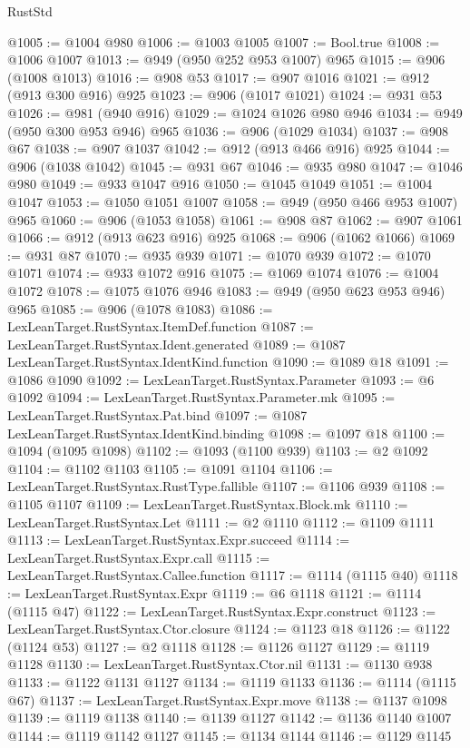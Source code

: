 \begin{lexlean}{RustStd}
\begin{coremodule}
@1005 := @1004 @980
@1006 := @1003 @1005
@1007 := Bool.true
@1008 := @1006 @1007
@1013 := @949 (@950 @252 @953 @1007) @965
@1015 := @906 (@1008 @1013)
@1016 := @908 @53
@1017 := @907 @1016
@1021 := @912 (@913 @300 @916) @925
@1023 := @906 (@1017 @1021)
@1024 := @931 @53
@1026 := @981 (@940 @916)
@1029 := @1024 @1026 @980 @946
@1034 := @949 (@950 @300 @953 @946) @965
@1036 := @906 (@1029 @1034)
@1037 := @908 @67
@1038 := @907 @1037
@1042 := @912 (@913 @466 @916) @925
@1044 := @906 (@1038 @1042)
@1045 := @931 @67
@1046 := @935 @980
@1047 := @1046 @980
@1049 := @933 @1047 @916
@1050 := @1045 @1049
@1051 := @1004 @1047
@1053 := @1050 @1051 @1007
@1058 := @949 (@950 @466 @953 @1007) @965
@1060 := @906 (@1053 @1058)
@1061 := @908 @87
@1062 := @907 @1061
@1066 := @912 (@913 @623 @916) @925
@1068 := @906 (@1062 @1066)
@1069 := @931 @87
@1070 := @935 @939
@1071 := @1070 @939
@1072 := @1070 @1071
@1074 := @933 @1072 @916
@1075 := @1069 @1074
@1076 := @1004 @1072
@1078 := @1075 @1076 @946
@1083 := @949 (@950 @623 @953 @946) @965
@1085 := @906 (@1078 @1083)
@1086 := LexLeanTarget.RustSyntax.ItemDef.function
@1087 := LexLeanTarget.RustSyntax.Ident.generated
@1089 := @1087 LexLeanTarget.RustSyntax.IdentKind.function
@1090 := @1089 @18
@1091 := @1086 @1090
@1092 := LexLeanTarget.RustSyntax.Parameter
@1093 := @6 @1092
@1094 := LexLeanTarget.RustSyntax.Parameter.mk
@1095 := LexLeanTarget.RustSyntax.Pat.bind
@1097 := @1087 LexLeanTarget.RustSyntax.IdentKind.binding
@1098 := @1097 @18
@1100 := @1094 (@1095 @1098)
@1102 := @1093 (@1100 @939)
@1103 := @2 @1092
@1104 := @1102 @1103
@1105 := @1091 @1104
@1106 := LexLeanTarget.RustSyntax.RustType.fallible
@1107 := @1106 @939
@1108 := @1105 @1107
@1109 := LexLeanTarget.RustSyntax.Block.mk
@1110 := LexLeanTarget.RustSyntax.Let
@1111 := @2 @1110
@1112 := @1109 @1111
@1113 := LexLeanTarget.RustSyntax.Expr.succeed
@1114 := LexLeanTarget.RustSyntax.Expr.call
@1115 := LexLeanTarget.RustSyntax.Callee.function
@1117 := @1114 (@1115 @40)
@1118 := LexLeanTarget.RustSyntax.Expr
@1119 := @6 @1118
@1121 := @1114 (@1115 @47)
@1122 := LexLeanTarget.RustSyntax.Expr.construct
@1123 := LexLeanTarget.RustSyntax.Ctor.closure
@1124 := @1123 @18
@1126 := @1122 (@1124 @53)
@1127 := @2 @1118
@1128 := @1126 @1127
@1129 := @1119 @1128
@1130 := LexLeanTarget.RustSyntax.Ctor.nil
@1131 := @1130 @938
@1133 := @1122 @1131 @1127
@1134 := @1119 @1133
@1136 := @1114 (@1115 @67)
@1137 := LexLeanTarget.RustSyntax.Expr.move
@1138 := @1137 @1098
@1139 := @1119 @1138
@1140 := @1139 @1127
@1142 := @1136 @1140 @1007
@1144 := @1119 @1142 @1127
@1145 := @1134 @1144
@1146 := @1129 @1145

\end{coremodule}
\end{lexlean}
